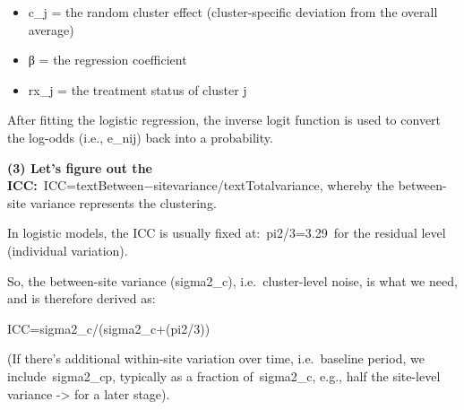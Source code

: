 \documentclass[
  letterpaper,
  DIV=11,
  numbers=noendperiod]{scrartcl}
\begin{document}
\begin{itemize}
\item
  c\_j = the random cluster effect (cluster-specific deviation from the
  overall average)
\item
  β = the regression coefficient
\item
  rx\_j = the treatment status of cluster j
\end{itemize}

After fitting the logistic regression, the inverse logit function is
used to convert the log-odds (i.e., e\_nij) back into a probability.

\textbf{(3) Let's figure out the
ICC:}~ICC=textBetween−sitevariance/textTotalvariance, whereby the
between-site variance represents the clustering.

In logistic models, the ICC is usually fixed at:~pi2/3=3.29~for the
residual level (individual variation).

So, the between-site variance (sigma2\_c), i.e.~cluster-level noise, is
what we need, and is therefore derived as:

ICC=sigma2\_c/(sigma2\_c+(pi2/3))

(If there's additional within-site variation over time, i.e.~baseline
period, we include~sigma2\_cp, typically as a fraction of~sigma2\_c,
e.g., half the site-level variance -\textgreater{} for a later stage).
\end{document}
